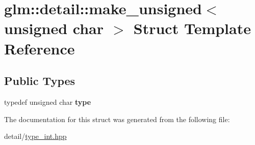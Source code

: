 \hypertarget{structglm_1_1detail_1_1make__unsigned_3_01unsigned_01char_01_4}{\section{glm\-:\-:detail\-:\-:make\-\_\-unsigned$<$ unsigned char $>$ Struct Template Reference}
\label{structglm_1_1detail_1_1make__unsigned_3_01unsigned_01char_01_4}
}
\subsection*{Public Types}
\begin{DoxyCompactItemize}
\item 
\hypertarget{structglm_1_1detail_1_1make__unsigned_3_01unsigned_01char_01_4_a783a55dc0559d4b972a0d85cf08256f2}{typedef unsigned char {\bfseries type}}\label{structglm_1_1detail_1_1make__unsigned_3_01unsigned_01char_01_4_a783a55dc0559d4b972a0d85cf08256f2}

\end{DoxyCompactItemize}


The documentation for this struct was generated from the following file\-:\begin{DoxyCompactItemize}
\item 
detail/\hyperlink{type__int_8hpp}{type\-\_\-int.\-hpp}\end{DoxyCompactItemize}
